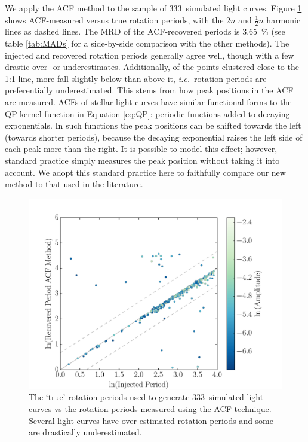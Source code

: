 \documentclass[useAMS, usenatbib, preprint, 12pt]{aastex}
\newcommand{\ie}{{\it i.e.}}
\newcommand{\naigrain}{333}
\newcommand{\percentacfMAD}{3.65}
\begin{document}
We apply the ACF method to the sample of \naigrain\ simulated light
curves.
Figure \ref{fig:compare_acf} shows ACF-measured versus true rotation
periods, with the $2n$ and $\frac{1}{2}n$ harmonic lines as dashed lines.
The MRD of the ACF-recovered periods is \percentacfMAD\ \% (see table
\ref{tab:MADs} for a side-by-side comparison with the other methods).
The injected and recovered rotation periods generally agree well,
though with a few drastic over- or underestimates.
Additionally, of the points clustered close to the 1:1 line,
more fall slightly below than above it, \ie\
rotation periods are preferentially underestimated.
This stems from how peak positions in the ACF are measured.
ACFs of stellar light curves have similar functional forms to the QP kernel
function in Equation \ref{eq:QP}: periodic functions added to decaying
exponentials.
In such functions the peak positions can be shifted towards the left
(towards shorter periods), because the decaying exponential raises the left side of
each peak more than the right.
It is possible to model this effect; however, standard practice
simply measures the peak position without taking it into account.
We adopt this standard practice here to faithfully compare
our new method to that used in the literature.

\begin{figure}
\begin{center}
\includegraphics[width=6in, clip=true]{figures/compare_acf.pdf}
\caption[ACF results.]
{The `true' rotation periods used to generate \naigrain\ simulated light
curves vs the rotation periods measured using the ACF technique.
    Several light curves have over-estimated rotation periods and some
    are drastically underestimated.}
\label{fig:compare_acf}
\end{center}
\end{figure}
\end{document}
